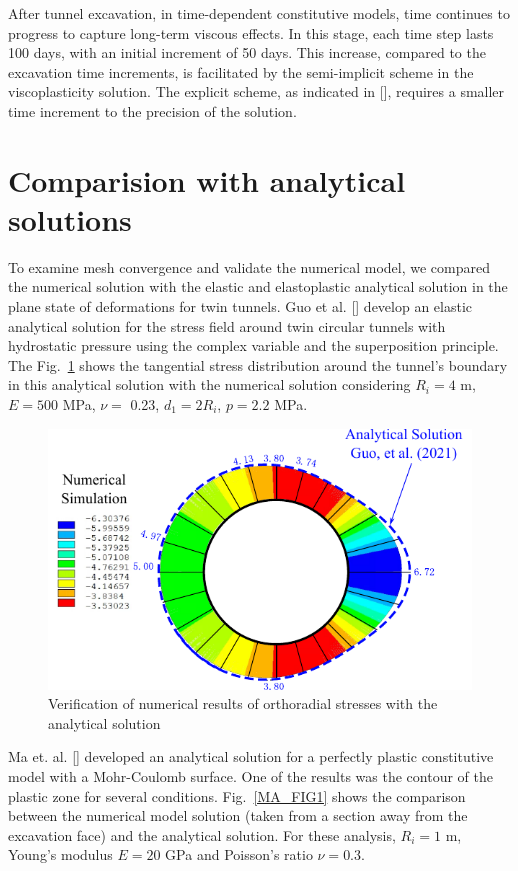 \documentclass[a4paper,fleqn]{cas-sc}
\begin{document}
After tunnel excavation, in time-dependent constitutive models, time continues to progress to capture long-term viscous effects. In this stage, each time step lasts 100 days, with an initial increment of 50 days. This increase, compared to the excavation time increments, is facilitated by the semi-implicit scheme in the viscoplasticity solution. The explicit scheme, as indicated in [], requires a smaller time increment to the precision of the solution.


\section{Comparision with analytical solutions}\label{}

To examine mesh convergence and validate the numerical model, we compared the numerical solution with the elastic and elastoplastic analytical solution in the plane state of deformations for twin tunnels. Guo et al. [] develop an elastic analytical solution for the stress field around twin circular tunnels with hydrostatic pressure using the complex variable and the superposition principle. The Fig.~\ref{GUO_FIG1} shows the tangential stress distribution around the tunnel's boundary in this analytical solution with the numerical solution considering  $R_i = 4$ m, $E = 500$ MPa, $\nu =$ 0.23, $d_1 = 2R_i$, $p = 2.2$ MPa.

\begin{figure}[h!]
	\centering
	\includegraphics[scale=1]{GUO_FIG1.pdf}
	\caption{Verification of numerical results of orthoradial stresses with the analytical solution}
	\label{GUO_FIG1}
\end{figure}
\FloatBarrier

Ma et. al. [] developed an analytical solution for a perfectly plastic constitutive model with a Mohr-Coulomb surface. One of the results was the contour of the plastic zone for several conditions. Fig.~\ref{MA_FIG1} shows the comparison between the numerical model solution (taken from a section away from the excavation face) and the analytical solution. For these analysis, $R_i = 1$ m, Young's modulus $E=20$ GPa and Poisson's ratio $\nu = 0.3$.
\end{document}
